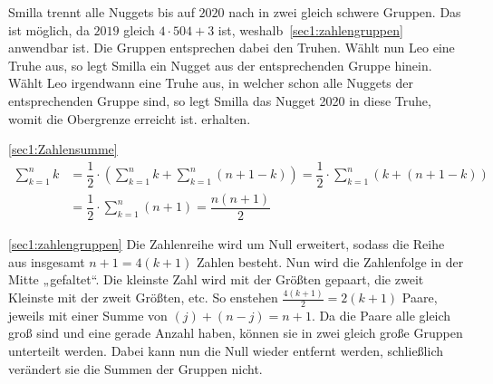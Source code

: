 \documentclass[10pt, a4paper]{amsart}
\makeatletter
\renewenvironment{proof}[1][\proofname]{\par
\pushQED{\qed}%
\normalfont \topsep6\p@\@plus6\p@\relax
\trivlist
\item\relax
{\bfseries#1}\hspace\labelsep\ignorespaces
}{%
\popQED\endtrivlist\@endpefalse
}
\newenvironment{proof thm}[1]{
\begin{proof}[\proofname~(#1)]}{\end{proof}}
\makeatother
\begin{document}
\begin{proof}
  Smilla trennt alle Nuggets bis auf $2020$ nach in zwei gleich schwere Gruppen.
  Das ist möglich, da $2019$ gleich $4\cdot504 + 3$ ist,
  weshalb~\autoref{sec1:zahlengruppen} anwendbar ist. Die Gruppen entsprechen
  dabei den Truhen. Wählt nun Leo eine Truhe aus, so legt Smilla ein Nugget aus
  der entsprechenden Gruppe hinein. Wählt Leo irgendwann eine Truhe aus, in
  welcher schon alle Nuggets der entsprechenden Gruppe sind, so legt Smilla das
  Nugget 2020 in diese Truhe, womit die Obergrenze erreicht ist. erhalten.
\end{proof}
\begin{proof thm}{\autoref{sec1:Zahlensumme}}
  \begin{align*}
    \sum^{n}_{k=1}k&=\dfrac{1}{2}\cdot\left( \sum^{n}_{k=1}k +
                     \sum^{n}_{k=1}(n+1-k)\right) = \dfrac{1}{2}\cdot\sum^{n}_{k=1}(k+(n+1-k))\\
                   &=\dfrac{1}{2}\cdot\sum^{n}_{k=1}(n+1) = \dfrac{n(n+1)}{2}
  \end{align*}
\end{proof thm}
\begin{proof thm}{\autoref{sec1:zahlengruppen}}
  Die Zahlenreihe wird um Null erweitert, sodass die Reihe aus insgesamt
  $n+1=4(k+1)$ Zahlen besteht. Nun wird die Zahlenfolge in der Mitte „gefaltet“.
  Die kleinste Zahl wird mit der Größten gepaart, die zweit Kleinste mit der
  zweit Größten, etc. So enstehen $\frac{4(k+1)}{2}=2(k+1)$ Paare, jeweils mit
  einer Summe von $(j)+(n-j) = n+1$. Da die Paare alle gleich groß sind und eine
  gerade Anzahl haben, können sie in zwei gleich große Gruppen unterteilt
  werden. Dabei kann nun die Null wieder entfernt werden, schließlich verändert
  sie die Summen der Gruppen nicht.
\end{proof thm}
\end{document}
